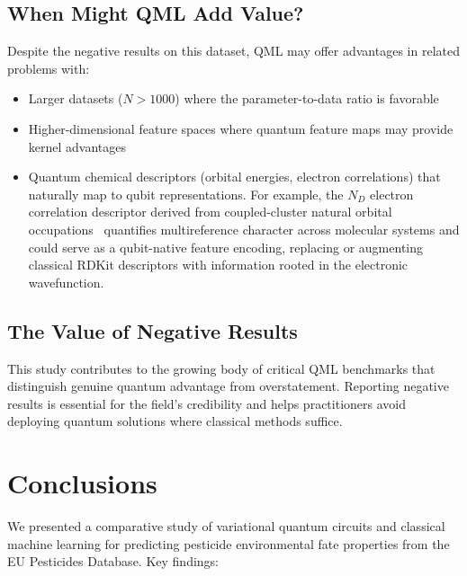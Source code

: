 \documentclass[12pt,a4paper]{article}
\begin{document}
\subsection{When Might QML Add Value?}

Despite the negative results on this dataset, QML may offer advantages in
related problems with:
\begin{itemize}[nosep]
  \item Larger datasets ($N > 1000$) where the parameter-to-data ratio
        is favorable
  \item Higher-dimensional feature spaces where quantum feature maps
        may provide kernel advantages~\cite{havlicek2019}
  \item Quantum chemical descriptors (orbital energies, electron
        correlations) that naturally map to qubit representations.
        For example, the $N_D$ electron correlation descriptor derived
        from coupled-cluster natural orbital occupations~\cite{arda2026nd}
        quantifies multireference character across molecular systems and
        could serve as a qubit-native feature encoding, replacing or
        augmenting classical RDKit descriptors with information rooted
        in the electronic wavefunction.
\end{itemize}

\subsection{The Value of Negative Results}

This study contributes to the growing body of critical QML benchmarks that
distinguish genuine quantum advantage from overstatement. Reporting negative results
is essential for the field's credibility and helps practitioners avoid
deploying quantum solutions where classical methods
suffice.\cite{cerezo2021}


\section{Conclusions}
\label{sec:conclusions}

We presented a comparative study of variational quantum circuits
and classical machine learning for predicting pesticide environmental fate
properties from the EU Pesticides Database. Key findings:
\end{document}
